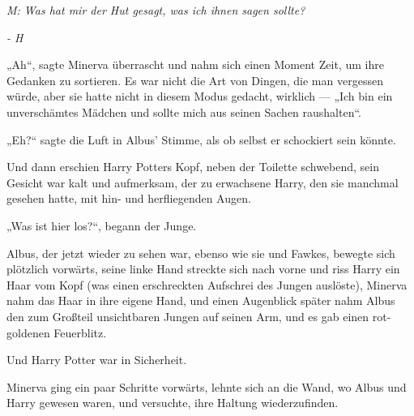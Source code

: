 \emph{M: Was hat mir der Hut gesagt, was ich ihnen sagen sollte?}

\emph{- H}

„Ah“, sagte Minerva überrascht und nahm sich einen Moment Zeit, um ihre Gedanken zu sortieren. Es war nicht die Art von Dingen, die man vergessen würde, aber sie hatte nicht in diesem Modus gedacht, wirklich —
„Ich bin ein unverschämtes Mädchen und sollte mich aus seinen Sachen raushalten“.

„Eh?“ sagte die Luft in Albus’ Stimme, als ob selbst er schockiert sein könnte.

Und dann erschien Harry Potters Kopf, neben der Toilette schwebend, sein Gesicht war kalt und aufmerksam, der zu erwachsene Harry, den sie manchmal gesehen hatte, mit hin- und herfliegenden Augen.

„Was ist hier los?“, begann der Junge.

Albus, der jetzt wieder zu sehen war, ebenso wie sie und Fawkes, bewegte sich plötzlich vorwärts, seine linke Hand streckte sich nach vorne und riss Harry ein Haar vom Kopf (was einen erschreckten Aufschrei des Jungen auslöste), Minerva nahm das Haar in ihre eigene Hand, und einen Augenblick später nahm Albus den zum Großteil unsichtbaren Jungen auf seinen Arm, und es gab einen rot-goldenen Feuerblitz.

Und Harry Potter war in Sicherheit.

Minerva ging ein paar Schritte vorwärts, lehnte sich an die Wand, wo Albus und Harry gewesen waren, und versuchte, ihre Haltung wiederzufinden.

